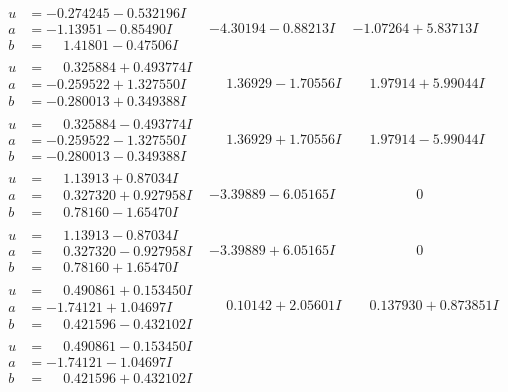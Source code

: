 \documentclass[1p]{elsarticle_modified}
\theoremstyle{definition}
\begin{document}
$$\begin{array}{c|c|c}
\begin{aligned}
u &= -0.274245 - 0.532196 I \\
a &= -1.13951 - 0.85490 I \\
b &= \phantom{-}1.41801 - 0.47506 I\end{aligned}
 & -4.30194 - 0.88213 I & -1.07264 + 5.83713 I \\ \hline\begin{aligned}
u &= \phantom{-}0.325884 + 0.493774 I \\
a &= -0.259522 + 1.327550 I \\
b &= -0.280013 + 0.349388 I\end{aligned}
 & \phantom{-}1.36929 - 1.70556 I & \phantom{-}1.97914 + 5.99044 I \\ \hline\begin{aligned}
u &= \phantom{-}0.325884 - 0.493774 I \\
a &= -0.259522 - 1.327550 I \\
b &= -0.280013 - 0.349388 I\end{aligned}
 & \phantom{-}1.36929 + 1.70556 I & \phantom{-}1.97914 - 5.99044 I \\ \hline\begin{aligned}
u &= \phantom{-}1.13913 + 0.87034 I \\
a &= \phantom{-}0.327320 + 0.927958 I \\
b &= \phantom{-}0.78160 - 1.65470 I\end{aligned}
 & -3.39889 - 6.05165 I & \phantom{-0.000000 } 0 \\ \hline\begin{aligned}
u &= \phantom{-}1.13913 - 0.87034 I \\
a &= \phantom{-}0.327320 - 0.927958 I \\
b &= \phantom{-}0.78160 + 1.65470 I\end{aligned}
 & -3.39889 + 6.05165 I & \phantom{-0.000000 } 0 \\ \hline\begin{aligned}
u &= \phantom{-}0.490861 + 0.153450 I \\
a &= -1.74121 + 1.04697 I \\
b &= \phantom{-}0.421596 - 0.432102 I\end{aligned}
 & \phantom{-}0.10142 + 2.05601 I & \phantom{-}0.137930 + 0.873851 I \\ \hline\begin{aligned}
u &= \phantom{-}0.490861 - 0.153450 I \\
a &= -1.74121 - 1.04697 I \\
b &= \phantom{-}0.421596 + 0.432102 I\end{aligned}

\end{array}$$
\end{document}
